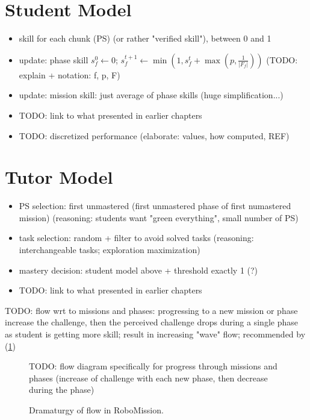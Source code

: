 \section{Student Model}

\begin{itemize}
\item skill for each chunk (PS) (or rather "verified skill"), between 0 and 1
\item update: phase skill $s^0_f \leftarrow 0$;
  $s^{t+1}_f \leftarrow \min(1, s^t_f + \max(p, \frac{1}{|F_f|}))$
  (TODO: explain + notation: f, p, F)
\item update: mission skill: just average of phase skills (huge simplification...)
\item TODO: link to what presented in earlier chapters
\item TODO: discretized performance (elaborate: values, how computed, REF)
\end{itemize}


\section{Tutor Model}

\begin{itemize}
\item PS selection: first unmastered
  (first unmastered phase of first numastered mission)
  (reasoning: students want "green everything", small number of PS)
\item task selection: random + filter to avoid solved tasks
  (reasoning: interchangeable tasks; exploration maximization)
\item mastery decision: student model above + threshold exactly 1 (?)
\item TODO: link to what presented in earlier chapters
\end{itemize}




TODO: flow wrt to missions and phases:
  progressing to a new mission or phase increase the challenge,
  then the perceived challenge drops during a single phase as student is getting
  more skill; result in increasing "wave" flow; recommended by \cite{book-of-lenses}
  (\cref{fig:robomission.flow})

\begin{figure}[htb]
\centering
TODO: flow diagram specifically for progress through missions and phases
(increase of challenge with each new phase, then decrease during the phase)
\caption{Dramaturgy of flow in RoboMission.}
\label{fig:robomission.flow}
\end{figure}






